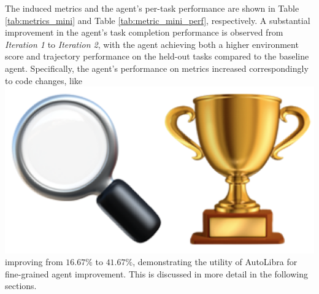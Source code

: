 

\begin{flushleft}
	The induced metrics and the agent's per-task performance are shown in Table \ref{tab:metrics_mini}
	and Table \ref{tab:metric_mini_perf}, respectively. A substantial improvement in
	the agent's task completion performance is observed from \emph{Iteration 1} to
	\emph{Iteration 2}, with the agent achieving both a higher environment score
	and trajectory performance on the held-out tasks compared to the baseline
	agent. Specifically, the agent's performance on metrics increased
	correspondingly to code changes, like
	\includegraphics[scale=0.05]{figs/emojis/mini_1.png}
	improving from $16.67\%$ to $41.67\%$, demonstrating the utility of AutoLibra
	for fine-grained agent improvement. This is discussed in more detail in the following
	sections.


\end{flushleft}
